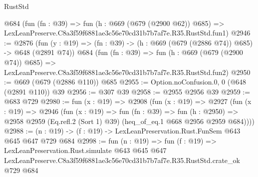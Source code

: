 \begin{lexlean}{RustStd}
\begin{coremodule}
    @684
    (fun (fn : @39) =>
    fun (h : @669 (@679 (@2900 @62)) @685) =>
    LexLeanPreserve.C8a3f59f6881ae3c56e70cd31b7b7af7e.R35.RustStd.fun1)
@2946 := @2876
    (fun (y : @19) => (fn : @39) -> (h : @669 (@679 (@2886 @74)) @685) -> @648 (@2891 @74))
    @684
    (fun (fn : @39) =>
    fun (h : @669 (@679 (@2900 @74)) @685) =>
    LexLeanPreserve.C8a3f59f6881ae3c56e70cd31b7b7af7e.R35.RustStd.fun2)
@2950 := @669 (@679 (@2886 @110)) @685
@2955 := Option.noConfusion.{0, 0} (@648 (@2891 @110)) @39
@2956 := @307 @39
@2958 := @2955 @2956 @39
@2959 := @683 @729
@2980 := fun (x : @19) =>
  @2908
    (fun (x : @19) =>
    @2927
      (fun (x : @19) =>
      @2946
        (fun (x : @19) =>
        fun (fn : @39) =>
        fun (h : @2950) =>
        @2958 @2959 (Eq.refl.{2} (Sort 1) @39) (heq_of_eq.{1} @668 @2956 @2959 @684))))
@2988 := (n : @19) -> (f : @19) -> LexLeanPreservation.Rust.FunSem @643 @645 @647 @729 @684
@2998 := fun (n : @19) =>
  fun (f : @19) =>
  LexLeanPreservation.Rust.simulate
    @643
    @645
    @647
    LexLeanPreserve.C8a3f59f6881ae3c56e70cd31b7b7af7e.R35.RustStd.crate_ok
    @729
    @684
\end{coremodule}
\end{lexlean}
